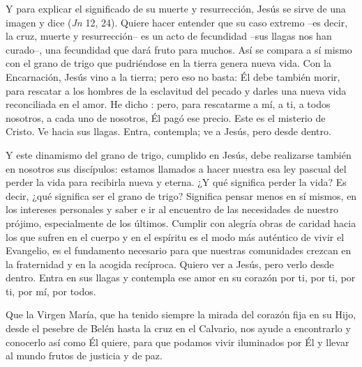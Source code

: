 \begin{body}
Y para explicar el significado de su muerte y resurrección, Jesús se sirve de una imagen y dice  (\textit{Jn} 12, 24). Quiere hacer entender que su caso extremo –es decir, la cruz, muerte y resurrección– es un acto de fecundidad –sus llagas nos han curado–, una fecundidad que dará fruto para muchos. Así se compara a sí mismo con el grano de trigo que pudriéndose en la tierra genera nueva vida. Con la Encarnación, Jesús vino a la tierra; pero eso no basta: Él debe también morir, para rescatar a los hombres de la esclavitud del pecado y darles una nueva vida reconciliada en el amor. He dicho : pero, para rescatarme a mí, a ti, a todos nosotros, a cada uno de nosotros, Él pagó ese precio. Este es el misterio de Cristo. Ve hacia sus llagas. Entra, contempla; ve a Jesús, pero desde dentro.

Y este dinamismo del grano de trigo, cumplido en Jesús, debe realizarse también en nosotros sus discípulos: estamos llamados a hacer nuestra esa ley pascual del perder la vida para recibirla nueva y eterna. ¿Y qué significa perder la vida? Es decir, ¿qué significa ser el grano de trigo? Significa pensar menos en sí mismos, en los intereses personales y saber  e ir al encuentro de las necesidades de nuestro prójimo, especialmente de los últimos. Cumplir con alegría obras de caridad hacia los que sufren en el cuerpo y en el espíritu es el modo más auténtico de vivir el Evangelio, es el fundamento necesario para que nuestras comunidades crezcan en la fraternidad y en la acogida recíproca. Quiero ver a Jesús, pero verlo desde dentro. Entra en sus llagas y contempla ese amor en su corazón por ti, por ti, por ti, por mí, por todos.

Que la Virgen María, que ha tenido siempre la mirada del corazón fija en su Hijo, desde el pesebre de Belén hasta la cruz en el Calvario, nos ayude a encontrarlo y conocerlo así como Él quiere, para que podamos vivir iluminados por Él y llevar al mundo frutos de justicia y de paz.
\end{body}


